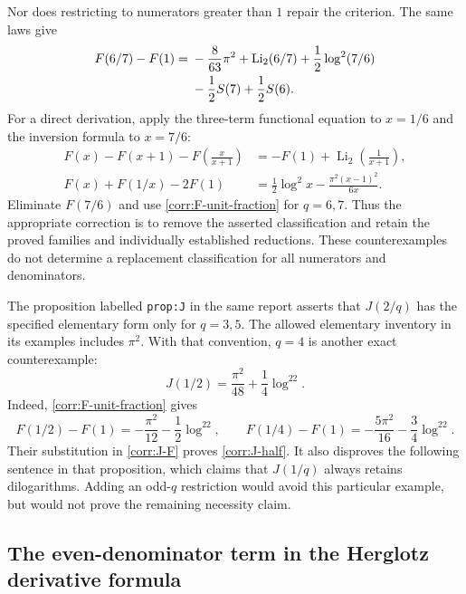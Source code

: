 Nor does restricting to numerators greater than $1$ repair the criterion.
The same laws give
\begin{align}
 F(6/7)-F(1)={}&-\frac8{63}\pi^2+\operatorname{Li}_2(6/7)
       +\frac12\log^2(7/6)\notag\\
       &-\frac12S(7)+\frac12S(6).
 \label{corr:F-six-sevenths}
\end{align}
For a direct derivation, apply the three-term functional equation to
$x=1/6$ and the inversion formula to $x=7/6$:
\begin{align*}
 F(x)-F(x+1)-F\left(\frac{x}{x+1}\right)
   &=-F(1)+\operatorname{Li}_2\left(\frac1{x+1}\right),\\
 F(x)+F(1/x)-2F(1)
   &=\frac12\log^2x-\frac{\pi^2(x-1)^2}{6x}.
\end{align*}
Eliminate $F(7/6)$ and use \eqref{corr:F-unit-fraction} for $q=6,7$.
Thus the appropriate correction is to remove the asserted
classification and retain the proved families and individually
established reductions.  These counterexamples do not determine a
replacement classification for all numerators and denominators.

The proposition labelled \texttt{prop:J} in the same report asserts
that $J(2/q)$ has the specified elementary form only for $q=3,5$.
The allowed elementary inventory in its examples includes $\pi^2$.
With that convention, $q=4$ is another exact counterexample:
\begin{equation}\label{corr:J-half}
 \boxed{\displaystyle J(1/2)=\frac{\pi^2}{48}
                                  +\frac14\log^22.}
\end{equation}
Indeed, \eqref{corr:F-unit-fraction} gives
\[
 F(1/2)-F(1)=-\frac{\pi^2}{12}-\frac12\log^22,
 \qquad
 F(1/4)-F(1)=-\frac{5\pi^2}{16}-\frac34\log^22.
\]
Their substitution in \eqref{corr:J-F} proves \eqref{corr:J-half}.
It also disproves the following sentence in that proposition, which
claims that $J(1/q)$ always retains dilogarithms.  Adding an odd-$q$
restriction would avoid this particular example, but would not prove
the remaining necessity claim.

\subsection{The even-denominator term in the Herglotz derivative formula}
\label{corr:herglotz-derivative}


